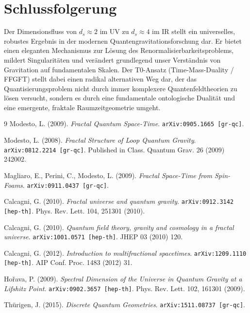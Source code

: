 	\section{Schlussfolgerung}
	Der Dimensionsfluss von $d_s \approx 2$ im UV zu $d_s \approx 4$ im IR stellt ein universelles, robustes Ergebnis in der modernen Quantengravitationsforschung dar. Er bietet einen eleganten Mechanismus zur Lösung des Renormalisierbarkeitsproblems, mildert Singularitäten und verändert grundlegend unser Verständnis von Gravitation auf fundamentalen Skalen. Der T0-Ansatz (Time-Mass-Duality / FFGFT) stellt dabei einen radikal alternativen Weg dar, der das Quantisierungsproblem nicht durch immer komplexere Quantenfeldtheorien zu lösen versucht, sondern es durch eine fundamentale ontologische Dualität und eine emergente, fraktale Raumzeitgeometrie umgeht.
	
	\begin{thebibliography}{9}
		Modesto, L. (2009). \textit{Fractal Quantum Space-Time}. \texttt{arXiv:0905.1665 [gr-qc]}.
		
		Modesto, L. (2008). \textit{Fractal Structure of Loop Quantum Gravity}. \texttt{arXiv:0812.2214 [gr-qc]}. Published in Class. Quantum Grav. 26 (2009) 242002.
		
		Magliaro, E., Perini, C., Modesto, L. (2009). \textit{Fractal Space-Time from Spin-Foams}. \texttt{arXiv:0911.0437 [gr-qc]}.
		
		Calcagni, G. (2010). \textit{Fractal universe and quantum gravity}. \texttt{arXiv:0912.3142 [hep-th]}. Phys. Rev. Lett. 104, 251301 (2010).
		
		Calcagni, G. (2010). \textit{Quantum field theory, gravity and cosmology in a fractal universe}. \texttt{arXiv:1001.0571 [hep-th]}. JHEP 03 (2010) 120.
		
		Calcagni, G. (2012). \textit{Introduction to multifractional spacetimes}. \texttt{arXiv:1209.1110 [hep-th]}. AIP Conf. Proc. 1483 (2012) 31.
		
		Hořava, P. (2009). \textit{Spectral Dimension of the Universe in Quantum Gravity at a Lifshitz Point}. \texttt{arXiv:0902.3657 [hep-th]}. Phys. Rev. Lett. 102, 161301 (2009).
		
		Thürigen, J. (2015). \textit{Discrete Quantum Geometries}. \texttt{arXiv:1511.08737 [gr-qc]}.
	\end{thebibliography}
	